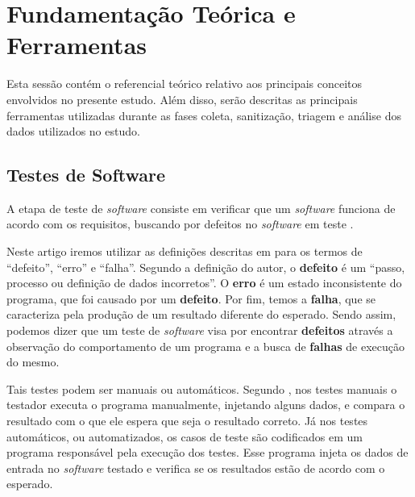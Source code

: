 \documentclass[11.5pt]{article}
\begin{document}


\section{Fundamentação Teórica e Ferramentas}

Esta sessão contém o referencial teórico relativo aos principais conceitos envolvidos no presente
estudo.
Além disso, serão descritas as principais ferramentas utilizadas durante as fases coleta,
sanitização, triagem e análise dos dados utilizados no estudo.


\subsection{Testes de Software}

A etapa de teste de \textit{software} consiste em verificar que um \textit{software} funciona de
acordo com os requisitos, buscando por defeitos no \textit{software} em teste
\cite{engSwSommerville}.

Neste artigo iremos utilizar as definições descritas em \cite{introTeste} para os termos de
``defeito'', ``erro'' e ``falha''.
Segundo a definição do autor, o \textbf{defeito} é um ``passo, processo ou definição de dados
incorretos''. O \textbf{erro} é um estado inconsistente do programa, que foi causado por um
\textbf{defeito}.
Por fim, temos a \textbf{falha}, que se caracteriza pela produção de um resultado diferente do
esperado.
Sendo assim, podemos dizer que um teste de \textit{software} visa por encontrar \textbf{defeitos}
através a observação do comportamento de um programa e a busca de \textbf{falhas} de execução
do mesmo.

Tais testes podem ser manuais ou automáticos.
Segundo \cite{engSwSommerville}, nos testes manuais o testador executa o programa manualmente,
injetando alguns dados, e compara o resultado com o que ele espera que seja o resultado correto.
Já nos testes automáticos, ou automatizados, os casos de teste são codificados em um programa
responsável pela execução dos testes.
Esse programa injeta os dados de entrada no \textit{software} testado e verifica se os resultados
estão de acordo com o esperado.
\end{document}

